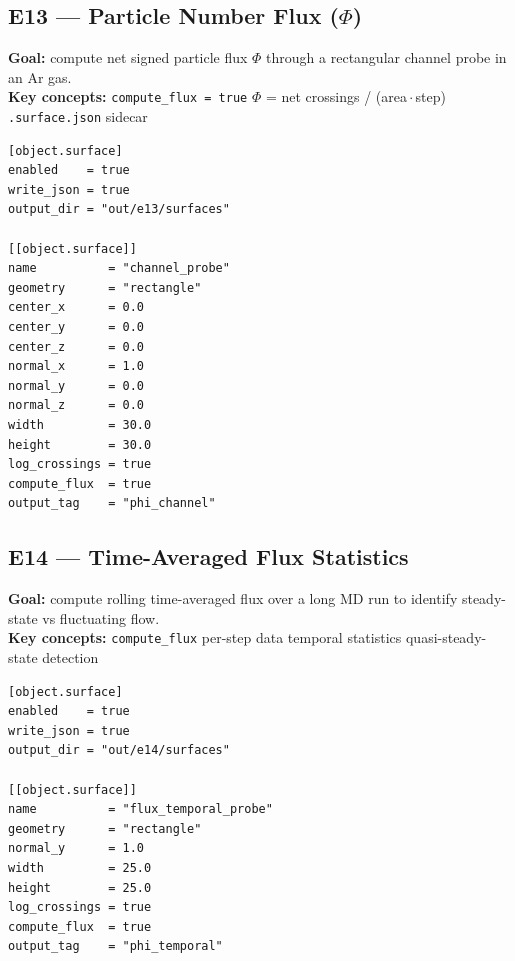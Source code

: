 \documentclass[11pt,a4paper]{article}
\begin{document}
\subsection*{E13 --- Particle Number Flux ($\Phi$)}

\textbf{Goal:} compute net signed particle flux $\Phi$ through a rectangular
channel probe in an Ar gas.\\
\textbf{Key concepts:} \texttt{compute\_flux = true} \textbullet{} $\Phi$ =
net crossings / (area\,$\cdot$\,step) \textbullet{} \texttt{.surface.json} sidecar

\begin{tcolorbox}[scriptbox, scriptheader,
  title={scripts/e13\_surface\_particle\_flux.vsim}]
\begin{lstlisting}[style=vsimlst]
[object.surface]
enabled    = true
write_json = true
output_dir = "out/e13/surfaces"

[[object.surface]]
name          = "channel_probe"
geometry      = "rectangle"
center_x      = 0.0
center_y      = 0.0
center_z      = 0.0
normal_x      = 1.0
normal_y      = 0.0
normal_z      = 0.0
width         = 30.0
height        = 30.0
log_crossings = true
compute_flux  = true
output_tag    = "phi_channel"
\end{lstlisting}
\end{tcolorbox}

\subsection*{E14 --- Time-Averaged Flux Statistics}

\textbf{Goal:} compute rolling time-averaged flux over a long MD run to identify steady-state vs fluctuating flow.\\
\textbf{Key concepts:} \texttt{compute\_flux} per-step data \textbullet{}
temporal statistics \textbullet{} quasi-steady-state detection

\begin{tcolorbox}[scriptbox, scriptheader,
  title={scripts/e14\_surface\_time\_averaged\_flux.vsim (excerpt)}]
\begin{lstlisting}[style=vsimlst]
[object.surface]
enabled    = true
write_json = true
output_dir = "out/e14/surfaces"

[[object.surface]]
name          = "flux_temporal_probe"
geometry      = "rectangle"
normal_y      = 1.0
width         = 25.0
height        = 25.0
log_crossings = true
compute_flux  = true
output_tag    = "phi_temporal"
\end{lstlisting}
\end{tcolorbox}
\end{document}
